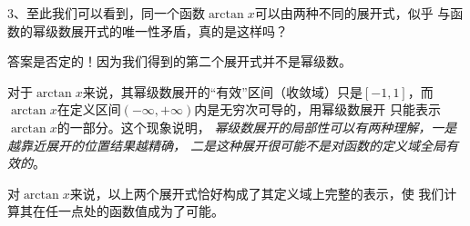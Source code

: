 \begin{shaded}
	\begin{center}
	\end{center}

	3、至此我们可以看到，同一个函数$\arctan x$可以由两种不同的展开式，似乎
	与函数的幂级数展开式的唯一性矛盾，真的是这样吗？

	答案是否定的！因为我们得到的第二个展开式并不是幂级数。

	对于$\arctan x$来说，其幂级数展开的“有效”区间（收敛域）只是$[-1,1]$，而
	$\arctan x$在定义区间$(-\infty,+\infty)$内是无穷次可导的，用幂级数展开
	只能表示$\arctan x$的一部分。这个现象说明，
	{\it 幂级数展开的局部性可以有两种理解，一是越靠近展开的位置结果越精确，
	二是这种展开很可能不是对函数的定义域全局有效的}。

	对$\arctan x$来说，以上两个展开式恰好构成了其定义域上完整的表示，使
	我们计算其在任一点处的函数值成为了可能。
\end{shaded}

